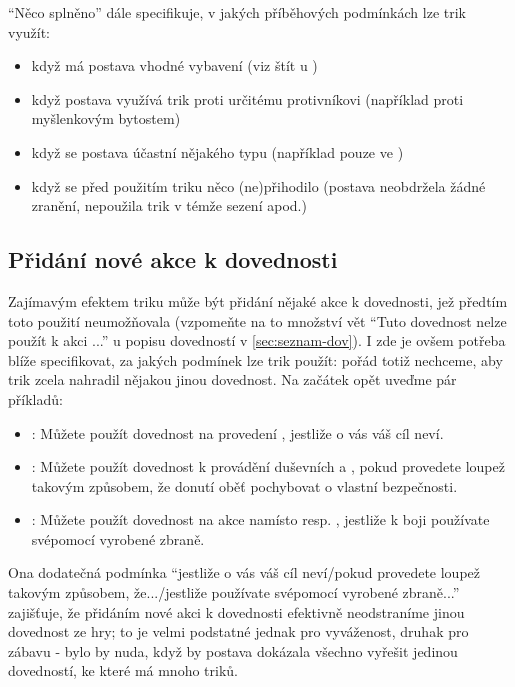 ``Něco splněno'' dále specifikuje, v jakých příběhových podmínkách lze trik využít:

\begin{itemize}
\item když má postava vhodné vybavení (viz štít u )
\item když postava využívá trik proti určitému protivníkovi (například proti myšlenkovým bytostem)
\item když se postava účastní nějakého typu  (například pouze ve )
\item když se před použitím triku něco (ne)přihodilo (postava neobdržela žádné zranění, nepoužila trik v témže sezení apod.)
\end{itemize}

\subsection{Přidání nové akce k dovednosti}
\label{sec:trik-pridani}

Zajímavým efektem triku může být přidání nějaké akce k dovednosti, jež předtím toto použití neumožňovala (vzpomeňte na to množství vět ``Tuto dovednost nelze použít k akci ...'' u popisu dovedností v \ref{sec:seznam-dov}). I zde je ovšem potřeba blíže specifikovat, za jakých podmínek lze trik použít: pořád totiž nechceme, aby trik zcela nahradil nějakou jinou dovednost.  Na začátek opět uveďme pár příkladů:

\begin{itemize}
\item {}:
  Můžete použít dovednost  na provedení , jestliže o vás váš cíl neví.
\item {}:
  Můžete použít dovednost  k provádění duševních  a , pokud provedete loupež takovým způsobem, že donutí oběť pochybovat o vlastní bezpečnosti.
\item {}:
  Můžete použít dovednost  na akce  namísto  resp. , jestliže k boji používate svépomocí vyrobené zbraně.
\end{itemize}

Ona dodatečná podmínka ``jestliže o vás váš cíl neví/pokud provedete loupež takovým způsobem, že.../jestliže používate svépomocí vyrobené zbraně...'' zajišťuje, že přidáním nové akci k dovednosti efektivně neodstraníme jinou dovednost ze hry; to je velmi podstatné jednak pro vyváženost, druhak pro zábavu - bylo by nuda, když by postava dokázala všechno vyřešit jedinou dovedností, ke které má mnoho triků.


